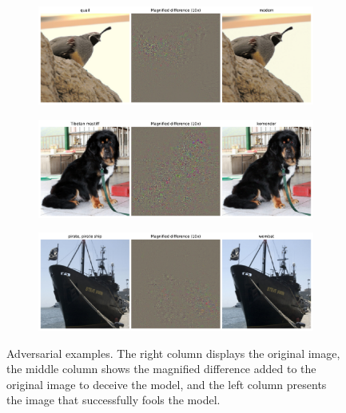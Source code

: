 \begin{figure}[p]
    \centering
    \begin{subfigure}[b]{\textwidth}
        \centering
        \includegraphics[width=.95\linewidth]{figs_propre2/adv_exmp.pdf}
        \label{fig:adv_exmp:sub1}
    \end{subfigure}
    
    \begin{subfigure}[b]{\textwidth}
        \centering
        \includegraphics[width=.95\linewidth]{figs_propre2/adv_exmp2.pdf}
        \label{fig:adv_exmp:sub2}
    \end{subfigure}

    \begin{subfigure}[b]{\textwidth}
        \centering
        \includegraphics[width=.95\linewidth]{figs_propre2/adv_exmp3.pdf}
        \label{fig:adv_exmp:sub3}
    \end{subfigure}
    \caption{Adversarial examples. The right column displays the original image, the middle column shows the magnified difference added to the original image to deceive the model, and the left column presents the image that successfully fools the model.}
    \label{fig:adv_exmp}
\end{figure}

